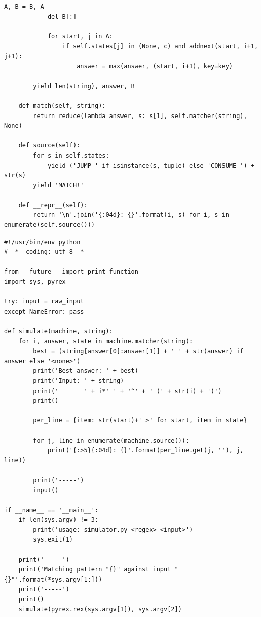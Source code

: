\documentclass[a4paper,12pt,oneside,onecolumn]{uerj}
\begin{document}
\begin{lstlisting}[caption={Código-fonte da biblioteca PyRex},label=lst:fill_appendice]
            A, B = B, A
            del B[:]

            for start, j in A:
                if self.states[j] in (None, c) and addnext(start, i+1, j+1):
                    answer = max(answer, (start, i+1), key=key)
            
        yield len(string), answer, B
        
    def match(self, string):
        return reduce(lambda answer, s: s[1], self.matcher(string), None)
     
    def source(self):
        for s in self.states:
            yield ('JUMP ' if isinstance(s, tuple) else 'CONSUME ') + str(s)
        yield 'MATCH!'
       
    def __repr__(self):
        return '\n'.join('{:04d}: {}'.format(i, s) for i, s in enumerate(self.source()))
\end{lstlisting}   

\label{app:view_source}

\begin{lstlisting}[caption={Código-fonte do Visualizador},label=lst:view_appendice]
#!/usr/bin/env python
# -*- coding: utf-8 -*-

from __future__ import print_function
import sys, pyrex

try: input = raw_input
except NameError: pass

def simulate(machine, string):
    for i, answer, state in machine.matcher(string):
        best = (string[answer[0]:answer[1]] + ' ' + str(answer) if answer else '<none>')
        print('Best answer: ' + best)
        print('Input: ' + string)
        print('       ' + i*' ' + '^' + ' (' + str(i) + ')')
        print()
        
        per_line = {item: str(start)+' >' for start, item in state}
        
        for j, line in enumerate(machine.source()):
            print('{:>5}{:04d}: {}'.format(per_line.get(j, ''), j, line))

        print('-----')
        input()
        
if __name__ == '__main__':
    if len(sys.argv) != 3:
        print('usage: simulator.py <regex> <input>')
        sys.exit(1)
        
    print('-----')
    print('Matching pattern "{}" against input "{}"'.format(*sys.argv[1:]))
    print('-----')
    print()
    simulate(pyrex.rex(sys.argv[1]), sys.argv[2])
\end{lstlisting}
  


\end{document}
